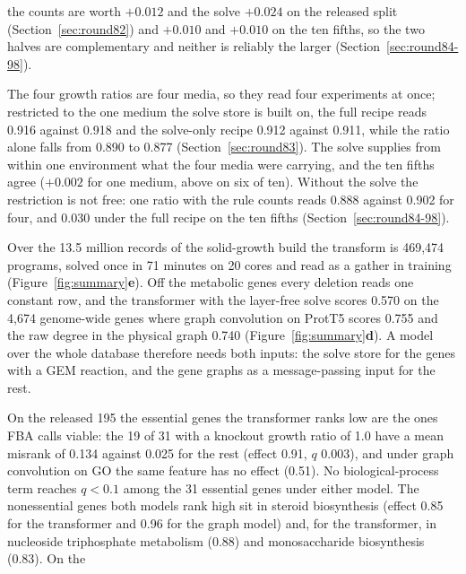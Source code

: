 \begin{description}
    the counts are worth $+0.012$ and the solve $+0.024$ on the released split
    (Section~\ref{sec:round82}) and $+0.010$ and $+0.010$ on the ten fifths, so the two
    halves are complementary and neither is reliably the larger
    (Section~\ref{sec:round84-98}).
  \item[Every metabolic column fits inside one experiment.] The four growth ratios are
    four media, so they read four experiments at once; restricted to the one medium the
    solve store is built on, the full recipe reads 0.916 against 0.918 and the solve-only
    recipe 0.912 against 0.911, while the ratio alone falls from 0.890 to 0.877
    (Section~\ref{sec:round83}). The solve supplies from within one environment what the
    four media were carrying, and the ten fifths agree ($+0.002$ for one medium, above
    on six of ten). Without the solve the restriction is not free: one ratio with the
    rule counts reads 0.888 against 0.902 for four, and 0.030 under the full recipe on
    the ten fifths (Section~\ref{sec:round84-98}).
  \item[The layer-free form scales, and it covers only the genes with a reaction.] Over
    the 13.5 million records of the solid-growth build the transform is 469,474
    programs, solved once in 71 minutes on 20 cores and read as a gather in training
    (Figure~\ref{fig:summary}\textbf{e}). Off the metabolic genes every deletion reads
    one constant row, and the transformer with the layer-free solve scores 0.570 on
    the 4,674 genome-wide genes where graph convolution on ProtT5 scores 0.755 and the
    raw degree in the physical graph 0.740 (Figure~\ref{fig:summary}\textbf{d}). A
    model over the whole database therefore needs both inputs: the solve store for the
    genes with a GEM reaction, and the gene graphs as a message-passing input for the
    rest.
  \item[The two families miss different genes, and the annotations say which.] On the
    released 195 the essential genes the transformer ranks low are the ones FBA calls
    viable: the 19 of 31 with a knockout growth ratio of 1.0 have a mean misrank of
    0.134 against 0.025 for the rest (effect 0.91, $q$ 0.003), and under graph
    convolution on GO the same feature has no effect (0.51). No biological-process term
    reaches $q < 0.1$ among the 31 essential genes under either model. The nonessential
    genes both models rank high sit in steroid biosynthesis (effect 0.85 for the
    transformer and 0.96 for the graph model) and, for the transformer, in nucleoside
    triphosphate metabolism (0.88) and monosaccharide biosynthesis (0.83). On the

\end{description}
